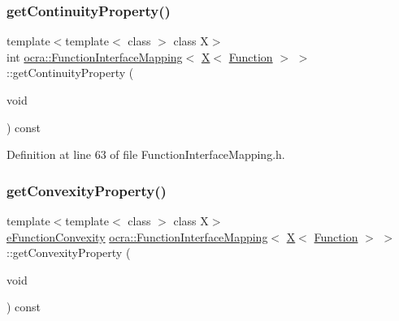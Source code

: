 \subsubsection{\texorpdfstring{get\+Continuity\+Property()}{getContinuityProperty()}}
{\footnotesize\ttfamily template$<$template$<$ class $>$ class X$>$ \\
int \hyperlink{structocra_1_1FunctionInterfaceMapping}{ocra\+::\+Function\+Interface\+Mapping}$<$ \hyperlink{namespaceocra_a436781c7059a0f76027df1c652126260a53f3cfeeb322946db40cd86dfebfb237}{X}$<$ \hyperlink{classocra_1_1Function}{Function} $>$ $>$\+::get\+Continuity\+Property (\begin{DoxyParamCaption}\item[{void}]{ }\end{DoxyParamCaption}) const\hspace{0.3cm}{\ttfamily [inline]}}



Definition at line 63 of file Function\+Interface\+Mapping.\+h.

\hypertarget{structocra_1_1FunctionInterfaceMapping_3_01X_3_01Function_01_4_01_4_a35d5a52fad803ab14e8840201b99badb}{}\label{structocra_1_1FunctionInterfaceMapping_3_01X_3_01Function_01_4_01_4_a35d5a52fad803ab14e8840201b99badb} 
\subsubsection{\texorpdfstring{get\+Convexity\+Property()}{getConvexityProperty()}}
{\footnotesize\ttfamily template$<$template$<$ class $>$ class X$>$ \\
\hyperlink{namespaceocra_ae6e8dca6121e9618486a449754876119}{e\+Function\+Convexity} \hyperlink{structocra_1_1FunctionInterfaceMapping}{ocra\+::\+Function\+Interface\+Mapping}$<$ \hyperlink{namespaceocra_a436781c7059a0f76027df1c652126260a53f3cfeeb322946db40cd86dfebfb237}{X}$<$ \hyperlink{classocra_1_1Function}{Function} $>$ $>$\+::get\+Convexity\+Property (\begin{DoxyParamCaption}\item[{void}]{ }\end{DoxyParamCaption}) const\hspace{0.3cm}{\ttfamily [inline]}}



